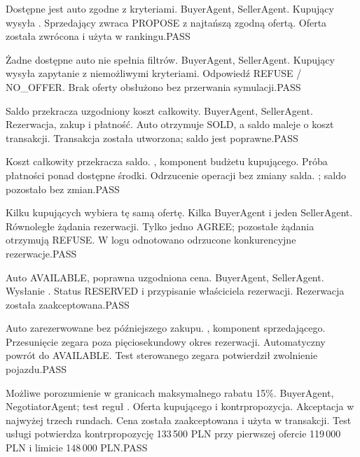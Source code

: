{Dostępne jest auto zgodne z kryteriami.}
{BuyerAgent, SellerAgent.}
{Kupujący wysyła .}
{Sprzedający zwraca PROPOSE z najtańszą zgodną ofertą.}
{Oferta została zwrócona i użyta w rankingu.}{PASS}

{Żadne dostępne auto nie spełnia filtrów.}
{BuyerAgent, SellerAgent.}
{Kupujący wysyła zapytanie z niemożliwymi kryteriami.}
{Odpowiedź REFUSE / NO\_OFFER.}
{Brak oferty obsłużono bez przerwania symulacji.}{PASS}

{Saldo przekracza uzgodniony koszt całkowity.}
{BuyerAgent, SellerAgent.}
{Rezerwacja, zakup i płatność.}
{Auto otrzymuje SOLD, a saldo maleje o koszt transakcji.}
{Transakcja została utworzona; saldo jest poprawne.}{PASS}

{Koszt całkowity przekracza saldo.}
{, komponent budżetu kupującego.}
{Próba płatności ponad dostępne środki.}
{Odrzucenie operacji bez zmiany salda.}
{; saldo pozostało bez zmian.}{PASS}

{Kilku kupujących wybiera tę samą ofertę.}
{Kilka BuyerAgent i jeden SellerAgent.}
{Równoległe żądania rezerwacji.}
{Tylko jedno AGREE; pozostałe żądania otrzymują REFUSE.}
{W logu odnotowano odrzucone konkurencyjne rezerwacje.}{PASS}

{Auto AVAILABLE, poprawna uzgodniona cena.}
{BuyerAgent, SellerAgent.}
{Wysłanie .}
{Status RESERVED i przypisanie właściciela rezerwacji.}
{Rezerwacja została zaakceptowana.}{PASS}

{Auto zarezerwowane bez późniejszego zakupu.}
{, komponent sprzedającego.}
{Przesunięcie zegara poza pięciosekundowy okres rezerwacji.}
{Automatyczny powrót do AVAILABLE.}
{Test sterowanego zegara potwierdził zwolnienie pojazdu.}{PASS}

{Możliwe porozumienie w granicach maksymalnego rabatu 15\%.}
{BuyerAgent, NegotiatorAgent; test reguł .}
{Oferta kupującego i kontrpropozycja.}
{Akceptacja w najwyżej trzech rundach.}
{Cena została zaakceptowana i użyta w transakcji. Test usługi
potwierdza kontrpropozycję 133\,500 PLN przy pierwszej ofercie
119\,000 PLN i limicie 148\,000 PLN.}{PASS}

